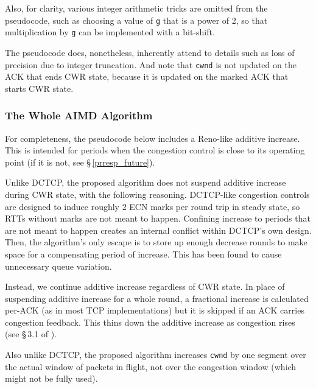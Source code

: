 Also, for clarity, various integer arithmetic tricks are omitted from the pseudocode, such as choosing a value of \texttt{g} that is a power of 2, so that multiplication by \texttt{g} can be implemented with a bit-shift.

The pseudocode does, nonetheless, inherently attend to details such as loss of precision due to integer truncation. And note that \texttt{cwnd} is not updated on the ACK that ends CWR state, because it is updated on the marked ACK that starts CWR state.

\subsubsection{The Whole AIMD Algorithm}\label{prresp_AIMD}

For completeness, the pseudocode below includes a Reno-like additive increase. This is intended for periods when the congestion control is close to its operating point (if it is not, see \S\,\ref{prresp_future}).

Unlike DCTCP, the proposed algorithm does not suspend additive increase during CWR state, with the following reasoning. DCTCP-like congestion controls are designed to induce roughly 2 ECN marks per round trip in steady state, so RTTs without marks are not meant to happen. Confining increase to periods that are not meant to happen creates an internal conflict within DCTCP's own design. Then, the algorithm's only escape is to store up enough decrease rounds to make space for a compensating period of increase. This has been found to cause unnecessary queue variation.

Instead, we continue additive increase regardless of CWR state. In place of suspending additive increase for a whole round, a fractional increase is calculated per-ACK (as in most TCP implementations) but it is skipped if an ACK carries congestion feedback. This thins down the additive increase as congestion rises (see \S\,3.1 of \cite{Briscoe17a:CC_Tensions_TR}).

Also unlike DCTCP, the proposed algorithm increases \texttt{cwnd} by one segment over the actual window of packets in flight, not over the congestion window (which might not be fully used).

